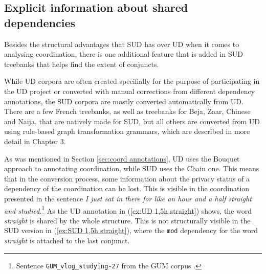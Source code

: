 \subsection{Explicit information about shared dependencies}\label{sec:shared-deps}
Besides the structural advantages that SUD has over UD when it comes to analysing coordination, there is one additional feature that is added in SUD treebanks that helps find the extent of conjuncts. 

While UD corpora are often created specifially for the purpose of participating in the UD project or converted with manual corrections from different dependency annotations, the SUD corpora are mostly converted automatically from UD. There are a few French treebanks, as well as treebanks for Beja, Zaar, Chinese and Naija, that are natively made for SUD, but all others are converted from UD using rule-based graph transformation grammars, which are described in more detail in Chapter 3. 

As was mentioned in Section \ref{sec:coord annotations}, UD uses the Bouquet approach to annotating coordination, while SUD uses the Chain one. This means that in the conversion process, some information about the privacy status of a dependency of the coordination can be lost. This is visible in the coordination presented in the sentence \textsl{I just sat in there for like an hour and a half straight and studied}.\footnote{Sentence \texttt{GUM\_vlog\_studying-27} from the GUM corpus \citep{Zeldes2017}.} As the UD annotation in (\ref{ex:UD 1,5h straight}) shows, the word \textsl{straight} is shared by the whole structure. This is not structurally visible in the SUD version in (\ref{ex:SUD 1,5h straight}), where the \texttt{mod} dependency for the word \textsl{straight} is attached to the last conjunct. 

